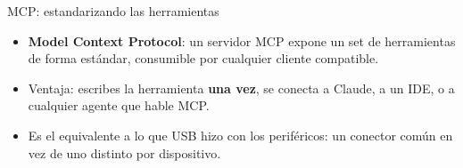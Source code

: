 \begin{frame}{MCP: estandarizando las herramientas}
  \begin{itemize}
    \item \textbf{Model Context Protocol}: un servidor MCP expone un set de
      herramientas de forma estándar, consumible por cualquier cliente compatible.
    \item Ventaja: escribes la herramienta \textbf{una vez}, se conecta a
      Claude, a un IDE, o a cualquier agente que hable MCP.
    \item Es el equivalente a lo que USB hizo con los periféricos: un
      conector común en vez de uno distinto por dispositivo.
  \end{itemize}
\end{frame}
